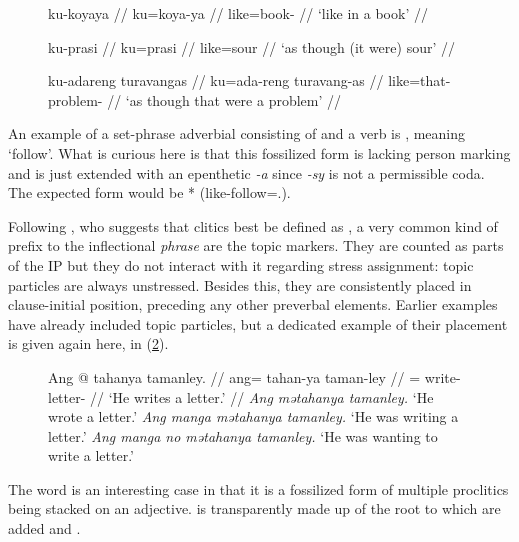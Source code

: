 \begin{figure}
\pex\label{ex:kucombin}
\a\begingl
	\gla ku-koyaya //
	\glb ku=koya-ya //
	\glc like=book-\Loc{} //
	\glft `like in a book' //
\endgl

\a\begingl
	\gla ku-prasi //
	\glb ku=prasi //
	\glc like=sour //
	\glft `as though (it were) sour' //
\endgl

\a\begingl
	\gla ku-adareng turavangas //
	\glb ku=ada-reng turavang-as //
	\glc like=that-\AargI{} problem-\Parg{} //
	\glft `as though that were a problem' //
\endgl
\xe
\end{figure}

An example of a set-phrase adverbial consisting of  and a verb 
is ,  meaning `follow'. 
What is curious here is that this fossilized form is lacking person marking 
and is just extended with an epenthetic \textit{-a} since \textit{-sy} is not 
a permissible coda. The expected form would be 
* (like-follow=\TsgI{}.\Aarg{}).

Following \citet{klavans1985}, who suggests that clitics best be defined as
, a very common
kind of prefix to the inflectional \emph{phrase} are the topic markers. They
are counted as parts of the IP but they do not interact with it regarding stress
assignment: topic particles are always unstressed. Besides this, they are consistently
placed in clause-initial position, preceding any other preverbal elements. 
Earlier examples have already included topic particles, but a dedicated example of their
placement is given again here, in (\ref{ex:topclt}).

\begin{figure}
\pex\label{ex:topclt}
	\a\begingl
		\gla Ang @ tahanya tamanley. //
		\glb ang= tahan-ya taman-ley //
		\glc \AgtT{}= write-\TsgM{} letter-\PargI{} //
		\glft `He writes a letter.' //
	\endgl
	\a \textit{Ang mətahanya tamanley.} `He wrote a letter.'
	\a \textit{Ang manga mətahanya tamanley.} `He was writing a letter.'
	\a \textit{Ang manga no mətahanya tamanley.} `He was wanting to write a 
		letter.'
\xe
\end{figure}

The word  is an
interesting case in that it is a fossilized form of multiple proclitics being
stacked on an adjective.  is transparently made up
of the root  to which are added
 and .

